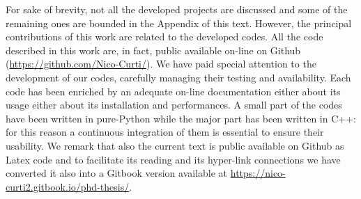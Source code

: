 \documentclass{standalone}
\begin{document}
For sake of brevity, not all the developed projects are discussed and some of the remaining ones are bounded in the Appendix of this text.
However, the principal contributions of this work are related to the developed codes.
All the code described in this work are, in fact, public available on-line on Github (\url{https://github.com/Nico-Curti/}).
We have paid special attention to the development of our codes, carefully managing their testing and availability.
Each code has been enriched by an adequate on-line documentation either about its usage either about its installation and performances.
A small part of the codes have been written in pure-\textsf{Python} while the major part has been written in \textsf{C++}: for this reason a continuous integration of them is essential to ensure their usability.
We remark that also the current text is public available on Github as \textsf{Latex} code and to facilitate its reading and its hyper-link connections we have converted it also into a \textsf{Gitbook} version available at \url{https://nico-curti2.gitbook.io/phd-thesis/}.




\end{document}
